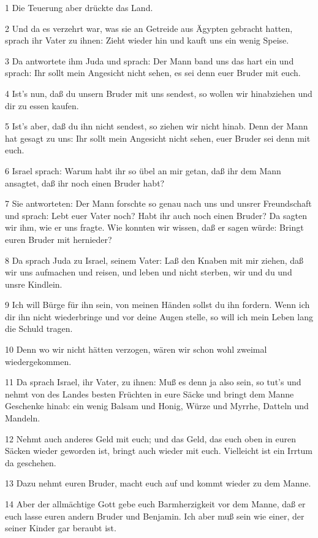 \par 1 Die Teuerung aber drückte das Land.
\par 2 Und da es verzehrt war, was sie an Getreide aus Ägypten gebracht hatten, sprach ihr Vater zu ihnen: Zieht wieder hin und kauft uns ein wenig Speise.
\par 3 Da antwortete ihm Juda und sprach: Der Mann band uns das hart ein und sprach: Ihr sollt mein Angesicht nicht sehen, es sei denn euer Bruder mit euch.
\par 4 Ist's nun, daß du unsern Bruder mit uns sendest, so wollen wir hinabziehen und dir zu essen kaufen.
\par 5 Ist's aber, daß du ihn nicht sendest, so ziehen wir nicht hinab. Denn der Mann hat gesagt zu uns: Ihr sollt mein Angesicht nicht sehen, euer Bruder sei denn mit euch.
\par 6 Israel sprach: Warum habt ihr so übel an mir getan, daß ihr dem Mann ansagtet, daß ihr noch einen Bruder habt?
\par 7 Sie antworteten: Der Mann forschte so genau nach uns und unsrer Freundschaft und sprach: Lebt euer Vater noch? Habt ihr auch noch einen Bruder? Da sagten wir ihm, wie er uns fragte. Wie konnten wir wissen, daß er sagen würde: Bringt euren Bruder mit hernieder?
\par 8 Da sprach Juda zu Israel, seinem Vater: Laß den Knaben mit mir ziehen, daß wir uns aufmachen und reisen, und leben und nicht sterben, wir und du und unsre Kindlein.
\par 9 Ich will Bürge für ihn sein, von meinen Händen sollst du ihn fordern. Wenn ich dir ihn nicht wiederbringe und vor deine Augen stelle, so will ich mein Leben lang die Schuld tragen.
\par 10 Denn wo wir nicht hätten verzogen, wären wir schon wohl zweimal wiedergekommen.
\par 11 Da sprach Israel, ihr Vater, zu ihnen: Muß es denn ja also sein, so tut's und nehmt von des Landes besten Früchten in eure Säcke und bringt dem Manne Geschenke hinab: ein wenig Balsam und Honig, Würze und Myrrhe, Datteln und Mandeln.
\par 12 Nehmt auch anderes Geld mit euch; und das Geld, das euch oben in euren Säcken wieder geworden ist, bringt auch wieder mit euch. Vielleicht ist ein Irrtum da geschehen.
\par 13 Dazu nehmt euren Bruder, macht euch auf und kommt wieder zu dem Manne.
\par 14 Aber der allmächtige Gott gebe euch Barmherzigkeit vor dem Manne, daß er euch lasse euren andern Bruder und Benjamin. Ich aber muß sein wie einer, der seiner Kinder gar beraubt ist.
